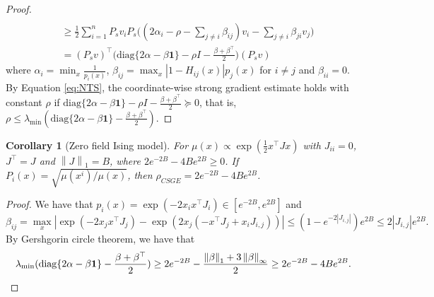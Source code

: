 \documentclass[11pt]{article}
\theoremstyle{plain}
\newtheorem{corollary}[theorem]{Corollary}
\theoremstyle{definition}
\theoremstyle{remark}
\newcommand{\norm}[1]{\left\lVert #1 \right\rVert}
\newcommand{\diag}{\mathrm{diag}}
\newcommand{\tuple}[1]{\left(#1\right)}
\newcommand{\tp}{\tuple}
\newcommand{\abs}[1]{\left\vert#1\right\vert}
\def\*#1{\boldsymbol{#1}} %
\begin{document}
\begin{proof}
\begin{align*}
        \\&\geq \frac 12\sum_{i=1}^n P_sv_iP_s\bigg((2\alpha_i-\rho - \sum_{j\neq i}\beta_{ij})v_i - \sum_{j\neq i}\beta_{ji}v_j\bigg)
        \\&=(P_sv)^\top \bigg(\diag\{2\alpha-\beta\*1\}-\rho I- \frac{\beta+\beta^{\top}}{2}\bigg) (P_sv)
    \end{align*}
    where $\alpha_i = \min_x \frac{1}{p_i(x)}$, $\beta_{ij} = \max_x|1-H_{ij}(x)|p_j(x)$ for $i\neq j$ and $\beta_{ii}=0$.
    By Equation \ref{eq:NTS}, the coordinate-wise strong gradient estimate holds with constant $\rho$ if $\diag\{2\alpha-\beta\*1\}-\rho I- \frac{\beta+\beta^{\top}}{2}\succeq 0$, that is,
    $\rho \leq \lambda_{\min}(\diag\{2\alpha-\beta\*1\} - \frac{\beta+\beta^{\top}}{2})$.
\end{proof}
\begin{corollary}[Zero field Ising model]
    For $\mu(x) \propto \exp(\frac 12 x^\top J x)$ with $J_{ii}=0$, $J^\top = J$ and $\norm{J}_1= B$, where $2e^{-2B}-4Be^{2B} \geq 0$.
    If $P_i(x) = \sqrt{\mu(x^i)/\mu(x)}$, then $\rho_{CSGE} = 2e^{-2B}-4Be^{2B}$.
\end{corollary}
\begin{proof}
    We have that $p_i(x) = \exp(-2x_ix^\top J_i)\in [e^{-2B},e^{2B}]$ and
    $$
       \beta_{ij} = \max_x \abs{\exp(-2x_jx^\top J_j)-\exp\tp{2x_j(-x^\top J_j+x_iJ_{i,j})}} \leq (1-e^{-2|J_{i,j}|})e^{2B} \leq 2|J_{i,j}|e^{2B}.
    $$
    By Gershgorin circle theorem, we have that
    \[
        \lambda_{\min}(\diag\{2\alpha-\beta\*1\} - \frac{\beta+\beta^{\top}}{2})
        \geq 2e^{-2B} - \frac {\norm{\beta}_1+3\norm{\beta}_\infty}2 \geq 2e^{-2B}-4Be^{2B} . \qedhere
    \]
\end{proof}
\end{document}
